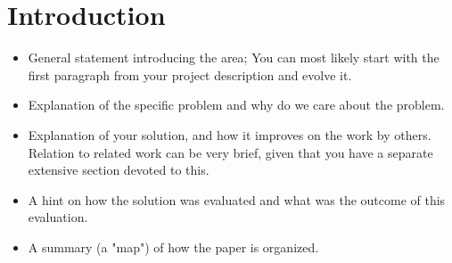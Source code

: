 \chapter{Introduction}
\begin{itemize}
\item General statement introducing the area; You can most likely start with the first paragraph from your project description and evolve it.
\item Explanation of the specific problem and why do we care about the problem.
\item Explanation of your solution, and how it improves on the work by others. Relation to related work can be very brief, given that you have a separate extensive section devoted to this.
\item A hint on how the solution was evaluated and what was the outcome of this evaluation.
\item A summary (a "map") of how the paper is organized.
\end{itemize}
